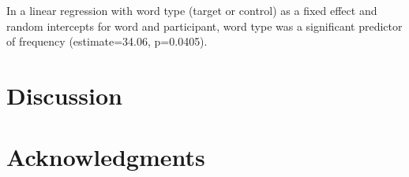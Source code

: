 \documentclass[10pt,letterpaper]{article}
\begin{document}
In a linear regression with word type (target or control) as a fixed effect and random intercepts for word and participant, word type was a significant predictor of frequency (estimate=34.06, p=0.0405).


% 


\section{Discussion}



\section{Acknowledgments}

\nocite{web1t5gram}
\nocite{lewis}



\setlength{\bibleftmargin}{.125in}
\setlength{\bibindent}{-\bibleftmargin}


\end{document}
